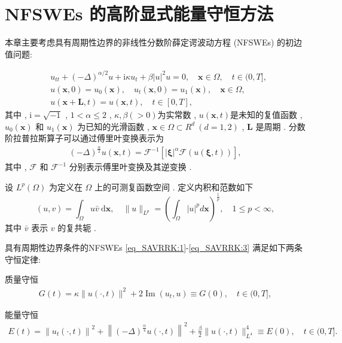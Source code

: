 \chapter[NFSWEs 的高阶显式能量守恒方法]{NFSWEs 的高阶显式能量守恒方法}

本章主要考虑具有周期性边界的非线性分数阶薛定谔波动方程 (NFSWEs) 的初边值问题:

\begin{align}
&  u_{t t}+(-\Delta)^{\alpha / 2} u+\mathrm{i} \kappa u_{t}+\beta|u|^{2} u=0 , \quad \boldsymbol{x} \in \Omega , \quad  t \in(0 , T] , \label{eq_SAVRRK:1}\\
& u(\boldsymbol{x} , 0)=u_{0}(\boldsymbol{x}) , \quad u_{t}(\boldsymbol{x} , 0)=u_{1}(\boldsymbol{x}) , \quad \boldsymbol{x} \in \Omega , \label{eq_SAVRRK:2}\\
& u(\boldsymbol{x}+\boldsymbol{L} , t)=u(\boldsymbol{x} , t) , \quad t \in[0 , T] , \label{eq_SAVRRK:3}
\end{align}
其中 , $\mathrm{i}=\sqrt{-1}$ , $1<\alpha \leq 2$ , $\kappa , \beta(>0)$为实常数 , $u(\boldsymbol{x} , t)$是未知的复值函数 , $u_{0}(\boldsymbol{x})$ 和 $u_{1}(\boldsymbol{x})$ 为已知的光滑函数 , $\boldsymbol{x}\in\Omega\!\subset\!
R^d~(d\!=\!1 , 2)$ , $\boldsymbol{L}$ 是周期 . 分数阶拉普拉斯算子可以通过傅里叶变换表示为
\begin{align}\label{eq_SAVRRK:4}
(-\Delta)^{\frac{\alpha}{2}} u(\boldsymbol{x} , t)=\mathcal{F}^{-1}\left[|\boldsymbol{\xi}|^{\alpha} \mathcal{F}(u(\boldsymbol{\xi} , t))\right] , 
\end{align}
其中 , $\mathcal{F}$ 和 $\mathcal{F}^{-1}$ 分别表示傅里叶变换及其逆变换 \cite{caffarelliExtensionProblemRelated2007} . 

设 $L^{p}(\Omega)$ 为定义在 $\Omega$ 上的可测复函数空间 . 定义内积和范数如下
\begin{equation}
(u , v)=\int_{\Omega} u \bar{v} \mathrm{~d} \boldsymbol{x} , \quad \|u\|_{L^{p}}=\left(\int_{\Omega}|u|^{p} d \boldsymbol{x}\right)^{\frac{1}{p}} , \quad 1 \leq p<\infty , 
\label{eq_6}
\end{equation}
其中 $\bar{v}$ 表示 $v$ 的复共轭 . 

\begin{theorem}
	具有周期性边界条件的NFSWEs \eqref{eq_SAVRRK:1}-\eqref{eq_SAVRRK:3}  满足如下两条守恒定律:

质量守恒
\begin{align}\label{eq_PAVF:_8}
    G(t)=\kappa\|u(\cdot , t)\|^{2}+2\operatorname{Im}\left(u_{t} , u\right) \equiv G(0) , \quad t \in(0 , T] , 
    \end{align}

能量守恒
\begin{align}\label{eq_SAVRRK:9}
	E(t)=\left\|u_{t}(\cdot , t)\right\|^{2}+\left\|(-\Delta)^{\frac{\alpha}{4}} u(\cdot , t)\right\|^{2}+\frac{\beta}{2}\|u(\cdot , t)\|_{L^{4}}^{4} \equiv E(0) , \quad t \in(0 , T] . 
	\end{align}
\end{theorem}

